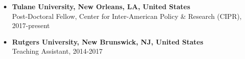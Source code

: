 \begin{itemize}
  \item[] {\bf Tulane University, New Orleans, LA, United States}\\
  Post-Doctoral Fellow, Center for Inter-American Policy \& Research (CIPR), 2017-present

  \item[] {\bf Rutgers University, New Brunswick, NJ, United States}\\
  Teaching Assistant, 2014-2017
\end{itemize}

